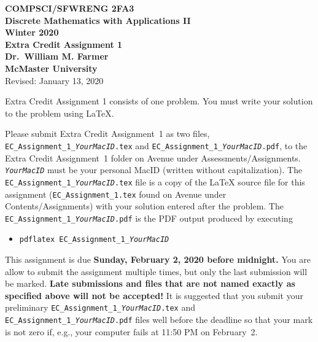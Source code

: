 \documentclass[11pt,fleqn]{article}
\newcommand{\bsp}{\begin{sloppypar}}
\newcommand{\esp}{\end{sloppypar}}
\begin{document}
\begin{center}

  {\large \textbf{COMPSCI/SFWRENG 2FA3}}\\[2mm]
  {\large \textbf{Discrete Mathematics with Applications II}}\\[2mm]
  {\large \textbf{Winter 2020}}\\[8mm]
  {\huge \textbf{Extra Credit Assignment 1}}\\[6mm]
  {\large \textbf{Dr.~William M. Farmer}}\\[2mm]
  {\large \textbf{McMaster University}}\\[6mm]
  {\large Revised: January 13, 2020}

\end{center}

\medskip

Extra Credit Assignment 1 consists of one problem.  You must write
your solution to the problem using LaTeX.

\bsp
Please submit Extra Credit Assignment~1 as two files,
\texttt{EC\_Assignment\_1\_\emph{YourMacID}.tex} and
\texttt{EC\_Assignment\_1\_\emph{YourMacID}.pdf}, to the Extra Credit
Assignment~1 folder on Avenue under Assessments/Assignments.
\texttt{\emph{YourMacID}} must be your personal MacID (written without
capitalization).  The \texttt{EC\_Assignment\_1\_\emph{YourMacID}.tex}
file is a copy of the LaTeX source file for this assignment
(\texttt{EC\_Assignment\_1.tex} found on Avenue under
Contents/Assignments) with your solution entered after the problem.
The \texttt{EC\_Assignment\_1\_\emph{YourMacID}.pdf} is the PDF output
produced by executing
\esp

\begin{itemize}

  \item[] \texttt{pdflatex EC\_Assignment\_1\_\emph{YourMacID}}

\end{itemize}

This assignment is due \textbf{Sunday, February 2, 2020 before
  midnight.}  You are allow to submit the assignment multiple times,
but only the last submission will be marked.  \textbf{Late submissions
  and files that are not named exactly as specified above will not be
  accepted!}  It is suggested that you submit your preliminary
\texttt{EC\_Assignment\_1\_\emph{YourMacID}.tex} and
\texttt{EC\_Assignment\_1\_\emph{YourMacID}.pdf} files well before the
deadline so that your mark is not zero if, e.g., your computer fails
at 11:50 PM on February~2.
\end{document}
